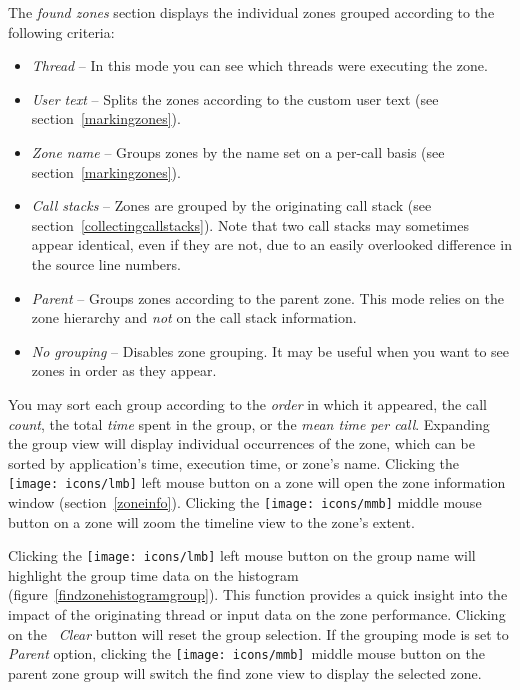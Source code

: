 \documentclass[hidelinks,titlepage,a4paper,twoside]{article}
\newcommand{\LMB}{\texttt{[image: icons/lmb]}}
\newcommand{\MMB}{\texttt{[image: icons/mmb]}}
\begin{document}
The \emph{found zones} section displays the individual zones grouped according to the following criteria:

\begin{itemize}
\item \emph{Thread} -- In this mode you can see which threads were executing the zone.
\item \emph{User text} -- Splits the zones according to the custom user text (see section~\ref{markingzones}).
\item \emph{Zone name} -- Groups zones by the name set on a per-call basis (see section~\ref{markingzones}).
\item \emph{Call stacks} -- Zones are grouped by the originating call stack (see section~\ref{collectingcallstacks}). Note that two call stacks may sometimes appear identical, even if they are not, due to an easily overlooked difference in the source line numbers.
\item \emph{Parent} -- Groups zones according to the parent zone. This mode relies on the zone hierarchy and \emph{not} on the call stack information.
\item \emph{No grouping} -- Disables zone grouping. It may be useful when you want to see zones in order as they appear.
\end{itemize}

You may sort each group according to the \emph{order} in which it appeared, the call \emph{count}, the total \emph{time} spent in the group, or the \emph{mean time per call}. Expanding the group view will display individual occurrences of the zone, which can be sorted by application's time, execution time, or zone's name. Clicking the \LMB{} left mouse button on a zone will open the zone information window (section~\ref{zoneinfo}). Clicking the \MMB{} middle mouse button on a zone will zoom the timeline view to the zone's extent.

Clicking the \LMB{} left mouse button on the group name will highlight the group time data on the histogram (figure~\ref{findzonehistogramgroup}). This function provides a quick insight into the impact of the originating thread or input data on the zone performance. Clicking on the \emph{\faBackspace~Clear} button will reset the group selection. If the grouping mode is set to \emph{Parent} option, clicking the \MMB{}~middle mouse button on the parent zone group will switch the find zone view to display the selected zone.
\end{document}

